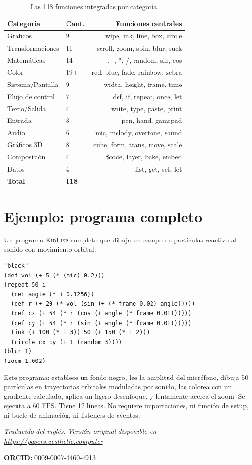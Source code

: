 \documentclass[10pt,letterpaper,twocolumn]{article}
\newcommand{\kl}{\textsc{KidLisp}}
\begin{document}
\begin{table}[h]
\small
\centering
\begin{tabularx}{\columnwidth}{Xlr}
\toprule
\textbf{Categoría} & \textbf{Cant.} & \textbf{Funciones centrales} \\
\midrule
Gráficos & 9 & wipe, ink, line, box, circle \\
Transformaciones & 11 & scroll, zoom, spin, blur, suck \\
Matemáticas & 14 & +, -, *, /, random, sin, cos \\
Color & 19+ & red, blue, fade, rainbow, zebra \\
Sistema/Pantalla & 9 & width, height, frame, time \\
Flujo de control & 7 & def, if, repeat, once, let \\
Texto/Salida & 4 & write, type, paste, print \\
Entrada & 3 & pen, hand, gamepad \\
Audio & 6 & mic, melody, overtone, sound \\
Gráficos 3D & 8 & cube, form, trans, move, scale \\
Composición & 4 & \$code, layer, bake, embed \\
Datos & 4 & list, get, set, let \\
\midrule
\textbf{Total} & \textbf{118} & \\
\bottomrule
\end{tabularx}
\caption{Las 118 funciones integradas por categoría.}
\label{tab:builtins}
\end{table}

\section{Ejemplo: programa completo}

Un programa \kl{} completo que dibuja un campo de partículas reactivo al sonido con movimiento orbital:

\begin{lstlisting}
"black"
(def vol (+ 5 (* (mic) 0.2)))
(repeat 50 i
  (def angle (* i 0.1256))
  (def r (+ 20 (* vol (sin (+ (* frame 0.02) angle)))))
  (def cx (+ 64 (* r (cos (+ angle (* frame 0.01))))))
  (def cy (+ 64 (* r (sin (+ angle (* frame 0.01))))))
  (ink (+ 100 (* i 3)) 50 (+ 150 (* i 2)))
  (circle cx cy (+ 1 (random 3))))
(blur 1)
(zoom 1.002)
\end{lstlisting}

Este programa: establece un fondo negro, lee la amplitud del micrófono, dibuja 50 partículas en trayectorias orbitales moduladas por sonido, las colorea con un gradiente calculado, aplica un ligero desenfoque, y lentamente acerca el zoom. Se ejecuta a 60 FPS. Tiene 12 líneas. No requiere importaciones, ni función de setup, ni bucle de animación, ni listeners de eventos.

\vspace{0.5em}
\noindent\textit{Traducido del inglés. Versión original disponible en \url{https://papers.aesthetic.computer}}

\vspace{0.5em}
\noindent\textbf{ORCID:} \href{https://orcid.org/0009-0007-4460-4913}{0009-0007-4460-4913}



\end{document}
